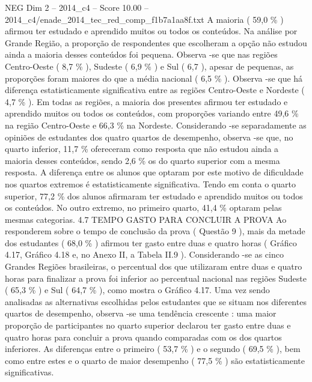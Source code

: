 \begin{textsample}{NEG Dim 2 – 2014\_c4 – Score 10.00 – 2014\_c4/enade\_2014\_tec\_red\_comp\_f1b7a1aa8f.txt}
A maioria ( 59,0 \% ) afirmou ter estudado e aprendido muitos ou todos os conteúdos.
Na análise por Grande Região, a proporção de respondentes que escolheram a opção não estudou ainda a maioria desses conteúdos foi pequena.
Observa -se que nas regiões Centro-Oeste ( 8,7 \% ), Sudeste ( 6,9 \% ) e Sul ( 6,7 ), apesar de pequenas, as proporções foram maiores do que a média nacional ( 6,5 \% ).
Observa -se que há diferença estatisticamente significativa entre as regiões Centro-Oeste e Nordeste ( 4,7 \% ).
Em todas as regiões, a maioria dos presentes afirmou ter estudado e aprendido muitos ou todos os conteúdos, com proporções variando entre 49,6 \% na região Centro-Oeste e 66,3 \% na Nordeste.
Considerando -se separadamente as opiniões de estudantes dos quatro quartos de desempenho, observa -se que, no quarto inferior, 11,7 \% ofereceram como resposta que não estudou ainda a maioria desses conteúdos, sendo 2,6 \% os do quarto superior com a mesma resposta.
A diferença entre os alunos que optaram por este motivo de dificuldade nos quartos extremos é estatisticamente significativa.
Tendo em conta o quarto superior, 77,2 \% dos alunos afirmaram ter estudado e aprendido muitos ou todos os conteúdos.
No outro extremo, no primeiro quarto, 41,4 \% optaram pelas mesmas categorias. 4.7 TEMPO GASTO PARA CONCLUIR A PROVA Ao responderem sobre o tempo de conclusão da prova ( Questão 9 ), mais da metade dos estudantes ( 68,0 \% ) afirmou ter gasto entre duas e quatro horas ( Gráfico 4.17, Gráfico 4.18 e, no Anexo II, a Tabela II.9 ).
Considerando -se as cinco Grandes Regiões brasileiras, o percentual dos que utilizaram entre duas e quatro horas para finalizar a prova foi inferior ao percentual nacional nas regiões Sudeste ( 65,3 \% ) e Sul ( 64,7 \% ), como mostra o Gráfico 4.17.
Uma vez sendo analisadas as alternativas escolhidas pelos estudantes que se situam nos diferentes quartos de desempenho, observa -se uma tendência crescente : uma maior proporção de participantes no quarto superior declarou ter gasto entre duas e quatro horas para concluir a prova quando comparadas com os dos quartos inferiores.
As diferenças entre o primeiro ( 53,7 \% ) e o segundo ( 69,5 \% ), bem como entre estes e o quarto de maior desempenho ( 77,5 \% ) são estatisticamente significativas.

\end{textsample}
